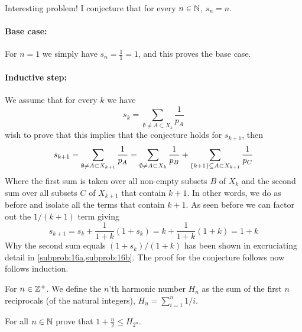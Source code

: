 \documentclass[a4paper, english, 12pt]{article} %
\begin{document}
\begin{answer}
  Interesting problem! I conjecture that for every $n \in \mathbb{N}$, $s_n = n$.
  \paragraph{Base case:} For $n = 1$ we simply have $s_n = \frac{1}{1} = 1$, and
  this proves the base case.
  \paragraph{Inductive step:} We assume that for every $k$ we have
  \begin{equation*}
    s_k = \sum_{\emptyset \neq A \subset X_k} \frac{1}{p_A} 
  \end{equation*}
  wish to prove that this implies that the conjecture holds for $s_{k+1}$, then
  \begin{equation*}
    s_{k+1}
      = \sum_{\emptyset \neq A \subset X_{k+1}} \frac{1}{p_A}
      = \sum_{\emptyset \neq A \subset X_{k}} \frac{1}{p_B} + \sum_{\{k+1\} \subseteq A \subset X_{k+1}} \frac{1}{p_C}\\ 
  \end{equation*}
  Where the first sum is taken over all non-empty subsets $B$ of $X_k$ and the
  second sum over all subsets $C$ of $X_{k+1}$ that contain $k+1$. In other
  words, we do as before and isolate all the terms that contain $k+1$. As seen
  before we can factor out the $1/(k+1)$ term giving
  \begin{equation*}
    s_{k+1}
    = s_k + \frac{1}{1+k} (1 + s_k) = k + \frac{1}{1+k}(1+k) = 1 + k
  \end{equation*}
  Why the second sum equals $(1+s_k)/(1+k)$ has been shown in excruciating
  detail in
  \cref{subprob:16a,subprob:16b}. The proof for the conjecture follows now follows induction.
\end{answer}

\begin{problem}
  For $n \in \mathbb{Z}^+$. We define the $n$'th harmonic number $H_n$ as the sum
  of the first $n$ reciprocals (of the natural integers),  $H_n = \sum_{i=1}^n 1/i$.
\end{problem}

\begin{subproblem}
  For all $n \in \mathbb{N}$ prove that $1 + \frac{n}{2} \leq H_{2^n}$.
\end{subproblem}
\end{document}
